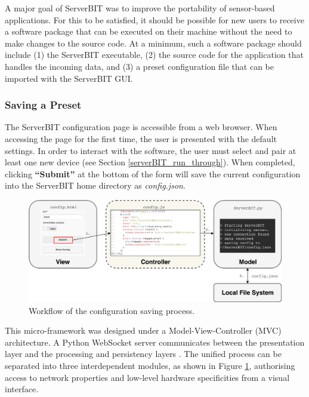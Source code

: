A major goal of ServerBIT was to improve the portability of sensor-based applications. For this to be satisfied, it should be possible for new users to receive a software package that can be executed on their machine without the need to make changes to the source code. At a minimum, such a software package should include (1) the ServerBIT executable, (2) the source code for the application that handles the incoming data, and (3) a preset configuration file that can be imported with the ServerBIT GUI.

\subsubsection*{Saving a Preset}

The ServerBIT configuration page is accessible from a web browser. When accessing the page for the first time, the user is presented with the default settings. In order to interact with the software, the user must select and pair at least one new device (see Section \ref{serverBIT_run_through}). When completed, clicking \textbf{``Submit''} at the bottom of the form will save the current configuration into the ServerBIT home directory as \textit{config.json}.

\begin{figure}[htbp]
    \centering
    \includegraphics[width=\textwidth]{Chapters/Figures/technical/ServerBIT/Websockets_ctrl.png}
    \caption{Workflow of the configuration saving process.}
    \label{fig:MVC_Diagram}
\end{figure}

This micro-framework was designed under a Model-View-Controller (MVC) architecture. A Python WebSocket server communicates between the presentation layer and the processing and persistency layers \cite{da_silva_web-based_2012}. The unified process can be separated into three interdependent modules, as shown in Figure \ref{fig:MVC_Diagram}, authorising access to network properties and low-level hardware specificities from a visual interface.

